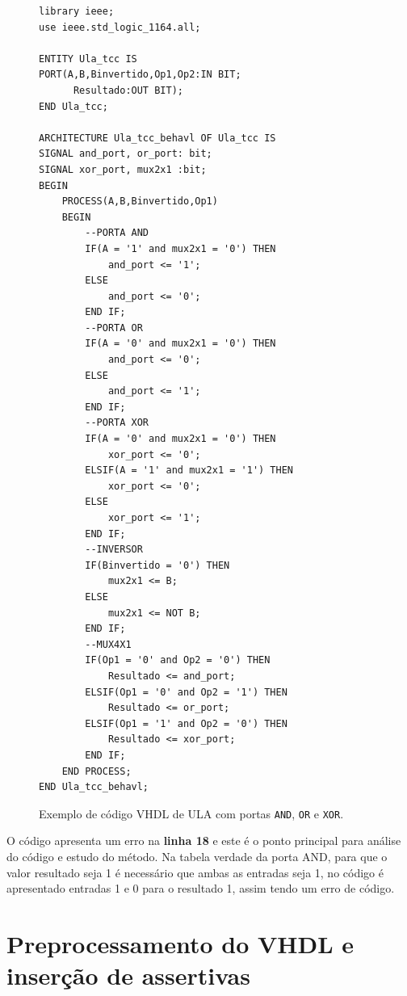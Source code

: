 \begin{figure}[H]
\caption{\label{fig:code_exemplo} Exemplo de código VHDL de ULA com portas \texttt{AND}, \texttt{OR} e \texttt{XOR}.}
	\begin{center}
    \begin{minipage}{0.7\textwidth}
    \begin{lstlisting}       
library ieee;
use ieee.std_logic_1164.all;

ENTITY Ula_tcc IS
PORT(A,B,Binvertido,Op1,Op2:IN BIT;
	  Resultado:OUT BIT);
END Ula_tcc;

ARCHITECTURE Ula_tcc_behavl OF Ula_tcc IS
SIGNAL and_port, or_port: bit;
SIGNAL xor_port, mux2x1 :bit;
BEGIN
	PROCESS(A,B,Binvertido,Op1)
	BEGIN
		--PORTA AND
		IF(A = '1' and mux2x1 = '0') THEN
		    and_port <= '1';
		ELSE
		    and_port <= '0';
		END IF;
		--PORTA OR
		IF(A = '0' and mux2x1 = '0') THEN
		    and_port <= '0';
		ELSE
		    and_port <= '1';
		END IF;
		--PORTA XOR
		IF(A = '0' and mux2x1 = '0') THEN
		    xor_port <= '0';
		ELSIF(A = '1' and mux2x1 = '1') THEN
		    xor_port <= '0';
		ELSE
		    xor_port <= '1';
		END IF;
		--INVERSOR
		IF(Binvertido = '0') THEN
			mux2x1 <= B;
		ELSE
			mux2x1 <= NOT B;
		END IF;
		--MUX4X1
		IF(Op1 = '0' and Op2 = '0') THEN
			Resultado <= and_port;
		ELSIF(Op1 = '0' and Op2 = '1') THEN
			Resultado <= or_port;
		ELSIF(Op1 = '1' and Op2 = '0') THEN
			Resultado <= xor_port;
		END IF;
	END PROCESS;
END Ula_tcc_behavl;
    \end{lstlisting}
    \end{minipage}
	\end{center}
\end{figure}

O código apresenta um erro na \textbf{linha 18} e este é o ponto principal para análise do código e estudo do método. Na tabela verdade da porta AND, para que o valor resultado seja 1 é necessário que ambas as entradas seja 1, no código é apresentado entradas 1 e 0 para o resultado 1, assim tendo um erro de código.

\section{Preprocessamento do VHDL e inserção de assertivas}
\label{cap:vhdl_assertivas}

